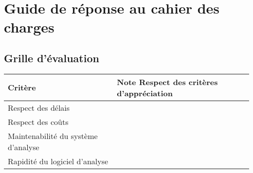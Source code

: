 
\section{Guide de réponse au cahier des charges}

\subsection{Grille d'évaluation}

\begin{center}
\begin{longtable}{|m{8cm}|m{1cm}|}
\hline
Critère & Note\endhead
\hline
Respect des critères d'appréciation
& %

\\\hline
Respect des délais
& %

\\\hline
Respect des coûts
& %

\\\hline
Maintenabilité du système d'analyse
& %

\\\hline
Rapidité du logiciel d'analyse
& %

\\\hline
\end{longtable}
\end{center}
